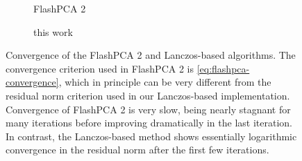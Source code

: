 \documentclass[review]{siamart0516}
\begin{document}
\begin{figure}
    \centering
    \begin{subfigure}{0.72\textwidth}
        \caption{FlashPCA 2}
    \end{subfigure}
    \begin{subfigure}{0.23\textwidth}
        \caption{this work}
    \end{subfigure}
    \caption{Convergence of the FlashPCA 2 and Lanczos-based algorithms. The
    convergence criterion used in FlashPCA 2 is \eqref{eq:flashpca-convergence},
    which in principle can be very different from the residual norm criterion used
    in our Lanczos-based implementation. Convergence of FlashPCA 2 is very slow,
    being nearly stagnant for many iterations before improving dramatically
    in the last iteration. In contrast, the Lanczos-based method shows essentially
    logarithmic convergence in the residual norm after the first few iterations.
    \label{fig:conv}
    }
\end{figure}
\end{document}
